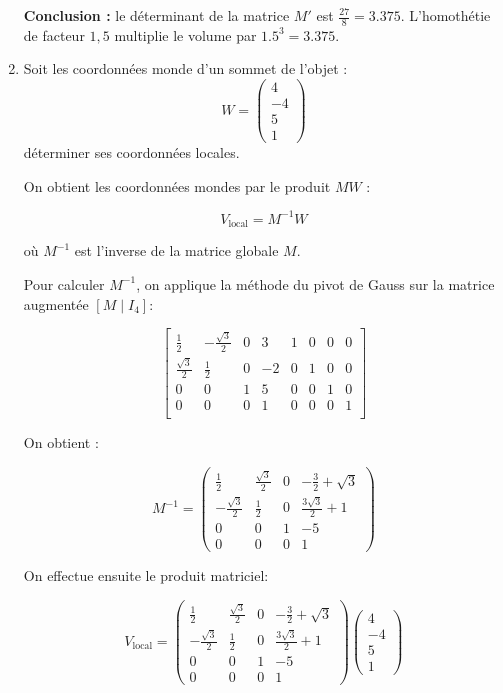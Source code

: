 \documentclass[a4paper,12pt]{article}
\begin{document}
\begin{enumerate}
    \textbf{Conclusion :} le déterminant de la matrice \(M'\) est \(\frac{27}{8} = 3.375\).  
    L’homothétie de facteur \(1{,}5\) multiplie le volume par \(1.5^3 = 3.375\). \newline

  \item Soit les coordonnées monde d'un sommet de l'objet :  
  \[
  W = \begin{pmatrix} 4 \\ -4 \\ 5 \\ 1 \end{pmatrix}
  \]
  déterminer ses coordonnées locales. \newline

    On obtient les coordonnées mondes par le produit $M W$ :

      \[
      V_{\text{local}} = M^{-1} W
      \]

    où $M^{-1}$ est l'inverse de la matrice globale $M$. \newline

    Pour calculer $M^{-1}$, on applique la méthode du pivot de Gauss sur la matrice augmentée $[M \mid I_4]$:

      \[
      \left[
      \begin{array}{cccc|cccc}
      \frac{1}{2} & -\frac{\sqrt{3}}{2} & 0 & 3 & 1 & 0 & 0 & 0 \\
      \frac{\sqrt{3}}{2} & \frac{1}{2} & 0 & -2 & 0 & 1 & 0 & 0 \\
      0 & 0 & 1 & 5 & 0 & 0 & 1 & 0 \\
      0 & 0 & 0 & 1 & 0 & 0 & 0 & 1 \\
      \end{array}
      \right]
      \]

    On obtient :

      \[
      M^{-1} =
      \begin{pmatrix}
      \frac{1}{2} & \frac{\sqrt{3}}{2} & 0 & -\frac{3}{2} + \sqrt{3} \\
      -\frac{\sqrt{3}}{2} & \frac{1}{2} & 0 & \frac{3\sqrt{3}}{2} + 1 \\
      0 & 0 & 1 & -5 \\
      0 & 0 & 0 & 1
      \end{pmatrix}
      \] \newline

    On effectue ensuite le produit matriciel:

      \[
      V_{\text{local}} = 
      \begin{pmatrix}
      \frac{1}{2} & \frac{\sqrt{3}}{2} & 0 & -\frac{3}{2} + \sqrt{3} \\
      -\frac{\sqrt{3}}{2} & \frac{1}{2} & 0 & \frac{3\sqrt{3}}{2} + 1 \\
      0 & 0 & 1 & -5 \\
      0 & 0 & 0 & 1
      \end{pmatrix}
      \begin{pmatrix}
      4 \\ -4 \\ 5 \\ 1
      \end{pmatrix}
      \]


\end{enumerate}
\end{document}
